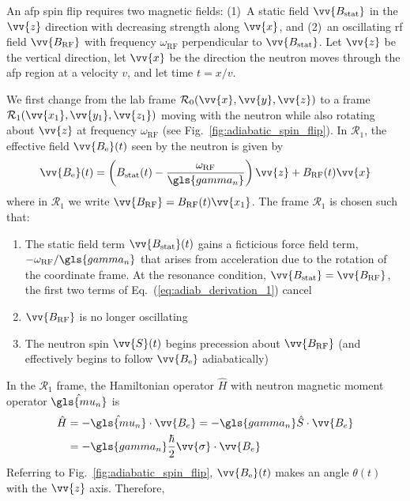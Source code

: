An \acrshort*{afp} spin flip requires two magnetic fields: (1)~A static field $\vv{B_\text{stat}}$ in the $\vv{z}$ direction with decreasing strength along $\vv{x}$, and (2)~an oscillating \acrshort{rf} field $\vv{B_\text{RF}}$ with frequency $\omega_\text{RF}$ perpendicular to $\vv{B_\text{stat}}$. Let $\vv{z}$ be the vertical direction, let $\vv{x}$ be the direction the neutron moves through the \acrshort*{afp} region at a velocity $v$, and let time $t=x/v$.

We first change from the lab frame $\mathcal{R}_0(\vv{x},\vv{y}, \vv{z})$ to a frame $\mathcal{R}_1(\vv{x_1},\vv{y_1}, \vv{z_1})$ moving with the neutron while also rotating about $\vv{z}$ at frequency $\omega_\text{RF}$ (see Fig.~\ref{fig:adiabatic_spin_flip}). In $\mathcal{R}_1$, the effective field $\vv{B_\text{e}}(t)$ seen by the neutron is given by
%
\begin{gather}
    \vv{B_\text{e}}(t)=\left(B_\text{stat}(t)-\frac{\omega_\text{RF}}{\gls{gamma_n}}\right)\vv{z}+B_\text{RF}(t)\vv{x} \label{eq:adiab_derivation_1}
\end{gather}
%
where in $\mathcal{R}_1$ we write $\vv{B_\text{RF}}=B_\text{RF}(t)\vv{x_1}$. The frame $\mathcal{R}_1$ is chosen such that:
%
\begin{enumerate}
    \item The static field term $\vv{B_\text{stat}}(t)$ gains a ficticious force field term, $-\omega_\text{RF}/\gls{gamma_n}$ that arises from acceleration due to the rotation of the coordinate frame. At the resonance condition, $\vv{B_\text{stat}} = \vv{B_\text{RF}}$, the first two terms of Eq.~(\ref{eq:adiab_derivation_1}) cancel
    \item $\vv{B_\text{RF}}$ is no longer oscillating
    \item The neutron spin $\vv{S}(t)$ begins precession about $\vv{B_\text{RF}}$ (and effectively begins to follow $\vv{B_\text{e}}$ adiabatically)
\end{enumerate}
%
In the $\mathcal{R}_1$ frame, the Hamiltonian operator $\hat{H}$ with neutron magnetic moment operator $\hat{\gls{mu_n}}$ is
%
\begin{align}
    \hat{H} &= -\hat{\gls{mu_n}}\cdot\vv{B_{e}}=-\gls{gamma_n}\hat{S}\cdot\vv{B_{e}} \nonumber \\
    &= -\gls{gamma_n}\frac{\hbar}{2}\vv{\sigma}\cdot\vv{B_{e}}
\end{align}
%
Referring to Fig.~\ref{fig:adiabatic_spin_flip}, $\vv{B_\text{e}}(t)$ makes an angle $\theta(t)$ with the $\vv{z}$ axis. Therefore,
%
